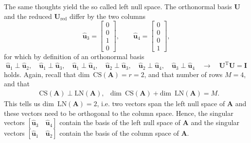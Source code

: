 \documentclass[a4paper, 11pt]{scrartcl}
\begin{document}
The same thoughts yield the so called left null space.
The orthonormal basis $\bm{U}$ and the reduced $\bm{U}_\text{red}$ differ by the two columns
$$
\hat{\bm{u}}_3 =
\begin{bmatrix}
0\\0\\1\\0
\end{bmatrix},\qquad
\hat{\bm{u}}_4 =
\begin{bmatrix}
0\\0\\0\\1
\end{bmatrix},
$$
for which by definition of an orthonormal basis
$$
\hat{\bm{u}}_1 \perp \hat{\bm{u}}_2,\quad
\hat{\bm{u}}_1 \perp \hat{\bm{u}}_3,\quad
\hat{\bm{u}}_1 \perp \hat{\bm{u}}_4,\quad
\hat{\bm{u}}_2 \perp \hat{\bm{u}}_3,\quad
\hat{\bm{u}}_2 \perp \hat{\bm{u}}_4,\quad
\hat{\bm{u}}_3 \perp \hat{\bm{u}}_4\quad\rightarrow\quad
\bm{U}^\mathrm{T} \bm{U} = \bm{I}
$$
holds.
Again, recall that $\text{dim}\,\,\, \text{CS}(\bm{A}) = r = 2$, and that number of rows $M=4$, and that
\begin{align*}
&\text{CS}(\bm{A}) \perp
\text{LN}(\bm{A}),
&\text{dim}\,\,\, \text{CS}(\bm{A}) + \text{dim}\,\,\, \text{LN}(\bm{A}) = M.
\end{align*}
This tells us $\text{dim}\,\,\, \text{LN}(\bm{A}) = 2$, i.e. two vectors span the left null space of $\bm{A}$ and these vectors need to be orthogonal to the column space.
%
Hence, the singular vectors $[\hat{\bm{u}}_3 \quad \hat{\bm{u}}_4]$ contain the basis of the left null space of $\bm{A}$
and the singular vectors $[\hat{\bm{u}}_1 \quad \hat{\bm{u}}_2]$ contain the basis of the column space of $\bm{A}$.
\end{document}
